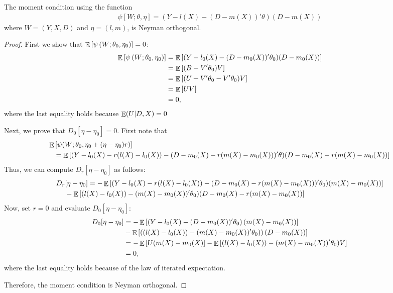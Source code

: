 \documentclass[11pt]{article}
\begin{document}
\begin{prop} \label{prop:psi}
The moment condition using the function \begin{align} 
\psi\left[ W; \theta, \eta \right] = (Y - l(X) - (D - m(X))'\theta)(D - m(X))
\label{eq:psi}
\end{align}
where $W = (Y, X, D)$ and $\eta = (l, m)$,  is Neyman orthogonal.
\end{prop}

\begin{proof}
First we show that 
 $\mathop{\mathbb{E}}\left[ \psi \left( W; \theta_0, \eta_0 \right) \right] =
0$:
\begin{align*}
\mathop{\mathbb{E}}\left[ \psi \left( W; \theta_0, \eta_0 \right) \right] &=
\mathop{\mathbb{E}} \left[ 
(Y - l_0(X) - (D - m_0(X))'\theta_0)(D - m_0(X))
\right] \\
&= \mathop{\mathbb{E}}\left[ (B - V'\theta_0)V \right]\\
& = \mathop{\mathbb{E}}\left[ (U + V'\theta_0 - V'\theta_0)V \right] \\
& = \mathop{\mathbb{E}}\left[ UV \right] \\
& = 0,
\end{align*}
where the last equality holds because $\mathop{\mathbb{E}}( U |D, X) = 0$

Next, we prove that $D_0\left[ \eta - \eta_0 \right] = 0$. First note that
\begin{align*}
 \mathop{\mathbb{E}}& \left [  \psi(W; \theta_0, \eta_0 + (\eta - \eta_0)r)  \right ] \\
 &= \mathop{\mathbb{E}}\left[ 
 (Y - l_0(X) - r (l(X) - l_0(X)) - (D - m_0(X)-r(m(X)-m_0(X)))'\theta)
 (D - m_0(X) - r(m(X) - m_0(X))
 \right]
\end{align*}
Thus, we can compute $D_r[\eta - \eta_0]$ as follows: 
\begin{align*}
D_r&[\eta - \eta_0] =  
- \mathop{\mathbb{E}}\left[
(Y - l_0(X) - r (l(X) - l_0(X)) - (D - m_0(X)-r(m(X)-m_0(X)))'\theta_0)
(m(X) - m_0(X))
\right]  \\
&-
\mathop{\mathbb{E}}\left[
 (l(X) - l_0(X)) - (m(X)-m_0(X))'\theta_0)
 (D - m_0(X) - r(m(X) - m_0(X))
\right]
\end{align*}
Now, set $r=0$ and evaluate $D_0[\eta - \eta_0]$:
\begin{align*}
D_0[\eta - \eta_0]
&= -\mathop{\mathbb{E}} \left[
\left( Y - l_0(X) - (D - m_0(X))'\theta_0 \right)
\left(
m(X) - m_0(X)
\right)
\right] \\
&- \mathop{\mathbb{E}} \left[
\left(
(l(X) - l_0(X)) - (m(X)-m_0(X))'\theta_0)
\right)
\left(
D - m_0(X)
\right)
\right] \\
& = -\mathop{\mathbb{E}}\left[ U (m(X) - m_0(X) \right]
- \mathop{\mathbb{E}}\left[ 
 (l(X) - l_0(X)) - (m(X)-m_0(X))'\theta_0)
 V
\right] \\
&= 0,
\end{align*}
where the last equality holds because of the law of iterated expectation.

Therefore, the moment condition is Neyman orthogonal.
\end{proof}
\end{document}
